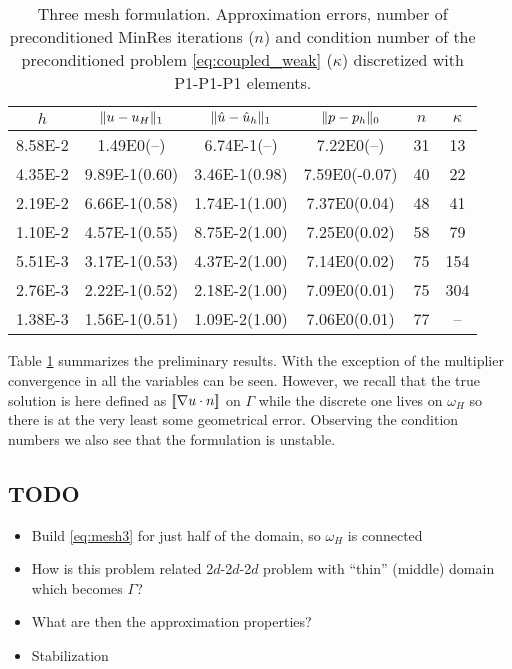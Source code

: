 \documentclass[r]{siamart171218}
\begin{document}
\begin{table}
  \begin{center}
    \scriptsize{
  \begin{tabular}{c|ccc|c|c}
    \hline
    $h$ & $\lVert{u-u_H}\rVert_1$ & $\lVert{\hat{u}-\hat{u}_h}\rVert_1$ & $\lVert{p-p_h}\rVert_0$ & $n$ & $\kappa$\\
    \hline
8.58E-2 & 1.49E0(--)    & 6.74E-1(--)   & 7.22E0(--)   & 31 & 13   \\
4.35E-2 & 9.89E-1(0.60) & 3.46E-1(0.98) & 7.59E0(-0.07)& 40 & 22 \\
2.19E-2 & 6.66E-1(0.58) & 1.74E-1(1.00) & 7.37E0(0.04) & 48 & 41 \\
1.10E-2 & 4.57E-1(0.55) & 8.75E-2(1.00) & 7.25E0(0.02) & 58 & 79 \\
5.51E-3 & 3.17E-1(0.53) & 4.37E-2(1.00) & 7.14E0(0.02) & 75 & 154 \\
2.76E-3 & 2.22E-1(0.52) & 2.18E-2(1.00) & 7.09E0(0.01) & 75 & 304 \\
1.38E-3 & 1.56E-1(0.51) & 1.09E-2(1.00) & 7.06E0(0.01) & 77 & -- \\
    \hline
  \end{tabular}
    }
    \caption{Three mesh formulation. Approximation errors, number of preconditioned MinRes iterations ($n$) and
      condition number of the preconditioned problem \eqref{eq:coupled_weak} ($\kappa$) discretized
      with P1-P1-P1 elements.}
  \label{tab:mesh3}
  \end{center}
\end{table}
%

Table \ref{tab:mesh3} summarizes the preliminary results. With the exception of the multiplier
convergence in all the variables can be seen. However, we recall that the
true solution is here defined as $[\![\nabla u\cdot n]\!]$ on $\Gamma$ while
the discrete one lives on $\omega_H$ so there is at the very least some
geometrical error. Observing the condition numbers we also see that the
formulation is unstable. 

\subsection{TODO}
\begin{itemize}
\item Build \eqref{eq:mesh3} for just half of the domain, so $\omega_H$ is connected
\item How is this problem related 2$d$-2$d$-2$d$ problem with ``thin'' (middle) domain
  which becomes $\Gamma$?
\item What are then the approximation properties?
\item Stabilization
\end{itemize}



\end{document}
